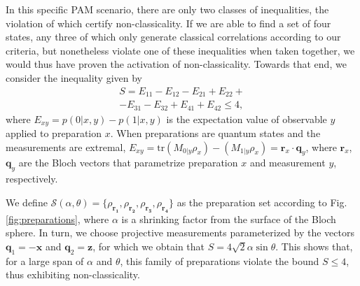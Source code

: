 \documentclass[a4paper,preprintnumbers,floatfix,superscriptaddress,pra,twocolumn,showpacs,notitlepage,longbibliography]{revtex4-2}
\begin{document}
        In this specific PAM scenario, there are only two classes of inequalities, the violation of which certify non-classicality. If we are able to find a set of four states, any three of which only generate classical correlations according to our criteria, but nonetheless violate one of these inequalities when taken together, we would thus have proven the activation of non-classicality. Towards that end, we consider the inequality given by \cite{pawlowski-qkd-2011}
        \begin{equation}
            \begin{split}
                S = E_{11} - E_{12} - E_{21} + E_{22} + \\ - E_{31} - E_{32} + E_{41} + E_{42} \leq 4,
            \end{split}
            \label{eq:inequality}
        \end{equation}
        where $E_{xy} = p(0 \vert x, y) - p(1 \vert x, y)$ is the expectation value of observable $y$ applied to preparation $x$. When preparations are quantum states and the measurements are extremal, $E_{xy} = \text{tr}(M_{0 \vert y} \rho_x) - (M_{1 \vert y} \rho_x) = \bm{r}_x \cdot \bm{q}_y$, where $\bm{r}_x$, $\bm{q}_y$ are the Bloch vectors that parametrize preparation $x$ and measurement $y$, respectively.
    
        We define $\mathcal{S}(\alpha, \theta) = \{ \rho_{\bm{r_1}}, \rho_{\bm{r_2}}, \rho_{\bm{r_3}}, \rho_{\bm{r_4}} \}$ as the preparation set according to Fig. \ref{fig:preparations}, where $\alpha$ is a shrinking factor from the surface of the Bloch sphere. In turn, we choose projective measurements parameterized by the vectors $\bm{q}_1 = - \bm{x}$ and  $\bm{q}_2 = \bm{z}$, for which we obtain that $S = 4\sqrt{2} \alpha \sin \theta$. This shows that, for a large span of $\alpha$ and $\theta$, this family of preparations violate the bound $S\leq 4$, thus exhibiting non-classicality.
        
\end{document}

